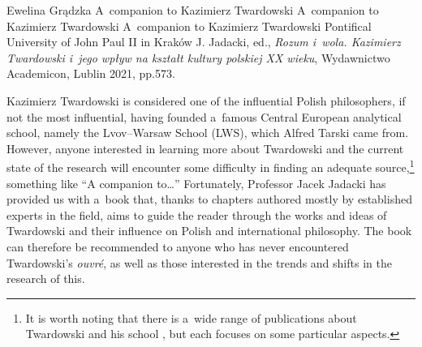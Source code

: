 \begin{newrevengenv}{Ewelina Grądzka}
	{A~companion to Kazimierz Twardowski}
	{A~companion to Kazimierz Twardowski}
	{A~companion to Kazimierz Twardowski}
	{Pontifical University of John Paul II in Kraków}
	{J. Jadacki, ed., \textit{Rozum i~wola. Kazimierz Twardowski i~jego wpływ na kształt kultury polskiej XX wieku}, Wydawnictwo Academicon, Lublin 2021, pp.573.}




Kazimierz Twardowski is considered one of the influential Polish philosophers, if not the most influential, having founded a~famous Central European analytical school, namely the Lvov–Warsaw School (LWS), which Alfred Tarski came from. However, anyone interested in learning more about Twardowski and the current state of the research will encounter some difficulty in finding an adequate source,\footnote{It is worth noting that there is a~wide range of publications about Twardowski and his school
\parencites[e.g.,][]{wolenski_filozoficzna_1985}{wolenski_logic_1989}{poli_polish_1993}{brandl_actions_1999}{chybinska_tradition_2016}{brozek_significance_2017}{drabarek_interdisciplinary_2019},
but each focuses on some particular aspects. } something like ``A companion to…'' Fortunately, Professor Jacek Jadacki has provided us with a~book that, thanks to chapters authored mostly by established experts in the field, aims to guide the reader through the works and ideas of Twardowski and their influence on Polish and international philosophy. The book can therefore be recommended to anyone who has never encountered Twardowski's \textit{ouvré}, as well as those interested in the trends and shifts in the research of this.


\end{newrevengenv}
